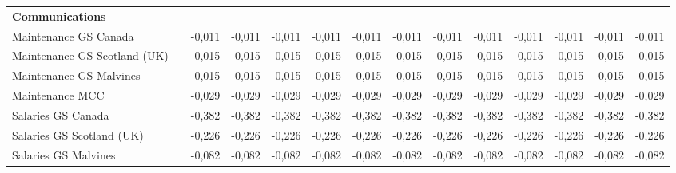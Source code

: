 \begin{landscape}
\begin{table}[]
{\begin{tabular}{| l | l | l | l | l | l | l | l | l | l | l | l | l | l |}
\textbf{Communications}                                                                &                  &                 &                 &                 &                 &                 &                 &                 &                 &                 &                  &                  &                  \\
Maintenance GS Canada                                                                  &                  & -0,011          & -0,011          & -0,011          & -0,011          & -0,011          & -0,011          & -0,011          & -0,011          & -0,011          & -0,011           & -0,011           & -0,011           \\
Maintenance GS Scotland (UK)                                                           &                  & -0,015          & -0,015          & -0,015          & -0,015          & -0,015          & -0,015          & -0,015          & -0,015          & -0,015          & -0,015           & -0,015           & -0,015           \\
Maintenance GS Malvines                                                                &                  & -0,015          & -0,015          & -0,015          & -0,015          & -0,015          & -0,015          & -0,015          & -0,015          & -0,015          & -0,015           & -0,015           & -0,015           \\
Maintenance MCC                                                                        &                  & -0,029          & -0,029          & -0,029          & -0,029          & -0,029          & -0,029          & -0,029          & -0,029          & -0,029          & -0,029           & -0,029           & -0,029           \\
Salaries GS Canada                                                                     &                  & -0,382          & -0,382          & -0,382          & -0,382          & -0,382          & -0,382          & -0,382          & -0,382          & -0,382          & -0,382           & -0,382           & -0,382           \\
Salaries GS Scotland (UK)                                                              &                  & -0,226          & -0,226          & -0,226          & -0,226          & -0,226          & -0,226          & -0,226          & -0,226          & -0,226          & -0,226           & -0,226           & -0,226           \\
Salaries GS Malvines                                                                   &                  & -0,082          & -0,082          & -0,082          & -0,082          & -0,082          & -0,082          & -0,082          & -0,082          & -0,082          & -0,082           & -0,082           & -0,082           \\

\end{tabular}}
\end{table}
\end{landscape}
